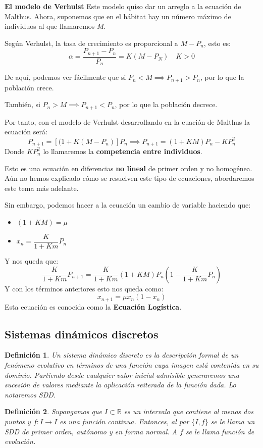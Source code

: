 \documentclass[11pt, a4paper]{article}
\newif\IfInSansMode
\numberwithin{equation}{section}
\newcommand{\R}{\mathbb{R}}
\theoremstyle{theorem-style}
\theoremstyle{definition-style}
\newtheorem{ndef}{Definición}[section]
\theoremstyle{remark-style}
\theoremstyle{example-style}
\begin{document}
\textbf{El modelo de Verhulst}
Este modelo quiso dar un arreglo a la ecuación de Malthus. Ahora, suponemos que en el hábitat hay un número máximo de individuos al que llamaremos $M$.

Según Verhulst, la tasa de crecimiento es proporcional a $M-P_n$, esto es:
\[
\alpha = \dfrac{P_{n+1}-P_n}{P_n} = K (M-P_N) \quad K > 0
\]

De aquí, podemos ver fácilmente que si $P_n < M \implies P_{n+1} > P_n$, por lo que la población crece.

También, si $P_n > M \implies P_{n+1} < P_n$, por lo que la población decrece.

Por tanto, con el modelo de Verhulst desarrollando en la euación de Malthus la ecuación será:
\[
P_{n+1} = [(1+K(M-P_n)]P_n \implies P_{n+1} = (1+KM)P_n -KP_n^2
\]
Donde $KP_n^2$ lo llamaremos la \textbf{competencia entre individuos}.

Esto es una ecuación en diferencias \textbf{no lineal} de primer orden y no homogénea. Aún no hemos explicado cómo se resuelven este tipo de ecuaciones, abordaremos este tema más adelante.

Sin embargo, podemos hacer a la ecuación un cambio de variable haciendo que:
\begin{itemize}
	\item $(1+KM) = \mu$
	\item $x_n = \dfrac{K}{1+Km}P_n$
\end{itemize} 
Y nos queda que:
\[
\dfrac{K}{1+Km}P_{n+1} = \dfrac{K}{1+Km}(1+KM)P_n ( 1 - \dfrac{K}{1+Km}P_n)
\]
Y con los términos anteriores esto nos queda como:
\[
x_{n+1} = \mu x_n(1-x_n)
\]
Esta ecuación es conocida como la \textbf{Ecuación Logística}.

\subsection{Sistemas dinámicos discretos}

\begin{ndef}
	Un sistema dinámico discreto es la descripción formal de un fenómeno evolutivo en términos de una función cuya imagen está contenida en su dominio. Partiendo desde cualquier valor inicial admisible generaremos una sucesión de valores mediante la aplicación reiterada de la función dada. Lo notaremos SDD.
\end{ndef}

\begin{ndef}
	Supongamos que $I \subset \R$ es un intervalo que contiene al menos dos puntos y $f:I \to I$ es una función continua. Entonces, al par $\{I,f\}$ se le llama un SDD de primer orden, autónomo y en forma normal. A $f$ se le llama función de evolución.
\end{ndef}
\end{document}
